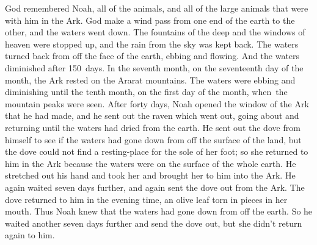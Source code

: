 
\begin{inparaenum}
     God remembered Noah, all of the animals, and all of the large animals that were with him in the Ark. God make a wind pass from one end of the earth to the other, and the waters went down.%
     The fountains of the deep and the windows of heaven were stopped up, and the rain from the sky was kept back.%
     The waters turned back from off the face of the earth, ebbing and flowing. And the waters diminished after 150~days.%
     In the seventh month, on the seventeenth day of the month, the Ark rested on the Ararat mountains.%
     The waters were ebbing and diminishing until the tenth month, on the first day of the month, when\understood\ the mountain peaks were seen.%
     After forty days, Noah opened the window of the Ark that he had made,%
     and he sent out the raven which went out, going about and returning until the waters had dried from the earth.%
     He sent out the dove from himself to see if the waters had gone down from off the surface of the land,%
     but the dove could not find a resting-place for the sole of her foot; so she returned to him in the Ark because the waters were on the surface of the whole earth. He stretched out his hand and took her and brought her to him into the Ark.%
     He again waited seven days further, and again sent the dove out from the Ark.%
     The dove returned to him in the evening time, an olive leaf torn in pieces in her mouth. Thus Noah knew that the waters had gone down from off the earth.%
     So he waited another seven days further and send the dove out, but she didn't return again to him.%
    
    
\end{inparaenum}
